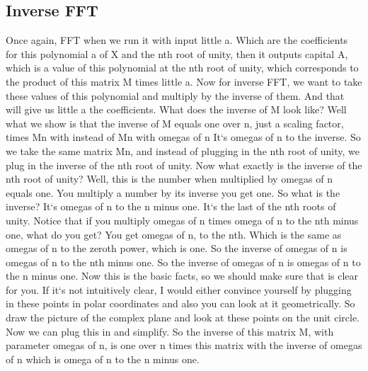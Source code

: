 \subsection{Inverse FFT}
Once again, FFT when we run it with input little a.
Which are the coefficients for this polynomial a of X and the nth root of unity, then it outputs capital A, which is a value of this polynomial at the nth root of unity, which corresponds to the product of this matrix M times little a.
Now for inverse FFT, we want to take these values of this polynomial and multiply by the inverse of them.
And that will give us little a the coefficients.
What does the inverse of M look like? Well what we show is that the inverse of M equals one over n, just a scaling factor, times Mn with instead of Mn with omegas of n It`s omegas of n to the inverse.
So we take the same matrix Mn, and instead of plugging in the nth root of unity, we plug in the inverse of the nth root of unity.
Now what exactly is the inverse of the nth root of unity? Well, this is the number when multiplied by omegas of n equals one.
You multiply a number by its inverse you get one.
So what is the inverse? It`s omegas of n to the n minus one.
It`s the last of the nth roots of unity.
Notice that if you multiply omegas of n times omega of n to the nth minus one, what do you get? You get omegas of n, to the nth.
Which is the same as omegas of n to the zeroth power, which is one.
So the inverse of omegas of n is omegas of n to the nth minus one.
So the inverse of omegas of n is omegas of n to the n minus one.
Now this is the basic facts, so we should make sure that is clear for you.
If it`s not intuitively clear, I would either convince yourself by plugging in these points in polar coordinates and also you can look at it geometrically.
So draw the picture of the complex plane and look at these points on the unit circle.
Now we can plug this in and simplify.
So the inverse of this matrix M, with parameter omegas of n, is one over n times this matrix with the inverse of omegas of n which is omega of n to the n minus one.

